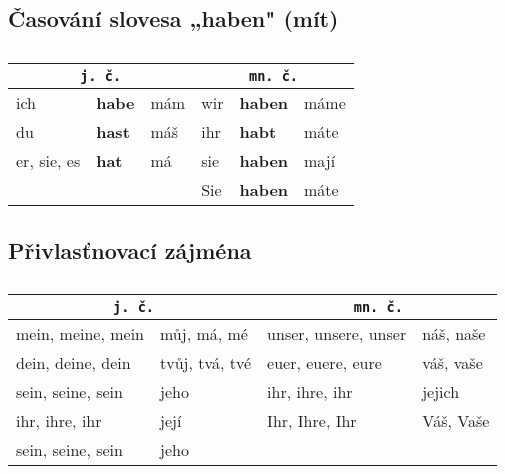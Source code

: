     \subsection*{Časování slovesa „haben" (mít)}
      \begin{table}[ht!]   %
        \centering
        \begin{tabular}{llllll}
          \hline
           \multicolumn{3}{c}{\texttt{j. č.}} &
           \multicolumn{3}{c}{\texttt{mn. č.}}                                 \\  
          \hline
            ich         & \textbf{habe} & mám & wir  & \textbf{haben} & máme  \\
            du          & \textbf{hast} & máš & ihr  & \textbf{habt}  & máte  \\
            er, sie, es & \textbf{hat}  & má  & sie  & \textbf{haben} & mají  \\
                        &               &     & Sie  & \textbf{haben} & máte  \\
          \hline
        \end{tabular}
        \caption*{ }
      \end{table}
  
    \subsection*{Přivlasťnovací zájména}
      \begin{table}[ht!]   %
        \centering
        \begin{tabular}{llll}
          \hline
          \multicolumn{2}{c}{\texttt{j. č.}} &
          \multicolumn{2}{c}{\texttt{mn. č.}}                       \\  
          \hline
            mein, meine, mein   & můj,  má,  mé    & unser, unsere, unser  & náš, naše  \\
            dein, deine, dein   & tvůj, tvá, tvé   & euer,  euere,  eure   & váš, vaše  \\
            sein, seine, sein   & jeho             & ihr,   ihre,   ihr    & jejich     \\
            ihr,  ihre,  ihr    & její             & Ihr,   Ihre,   Ihr    & Váš, Vaše  \\
            sein, seine, sein   & jeho             &                       &            \\
          \hline
        \end{tabular}
        \caption*{ }
      \end{table}
    
